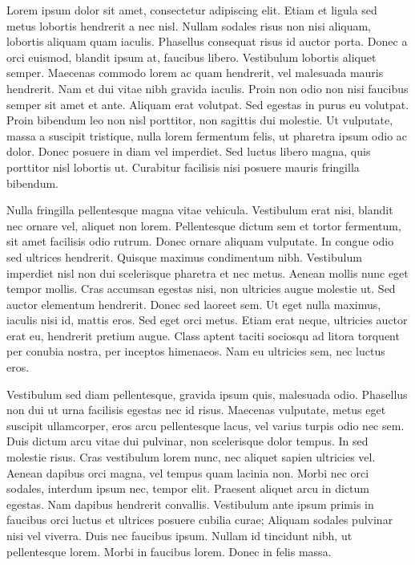 \documentclass[11pt,twoside]{article}
\begin{document}
Lorem ipsum dolor sit amet, consectetur adipiscing elit. Etiam et ligula sed metus lobortis hendrerit a nec nisl. Nullam sodales risus non nisi aliquam, lobortis aliquam quam iaculis. Phasellus consequat risus id auctor porta. Donec a orci euismod, blandit ipsum at, faucibus libero. Vestibulum lobortis aliquet semper. Maecenas commodo lorem ac quam hendrerit, vel malesuada mauris hendrerit. Nam et dui vitae nibh gravida iaculis. Proin non odio non nisi faucibus semper sit amet et ante. Aliquam erat volutpat. Sed egestas in purus eu volutpat. Proin bibendum leo non nisl porttitor, non sagittis dui molestie. Ut vulputate, massa a suscipit tristique, nulla lorem fermentum felis, ut pharetra ipsum odio ac dolor. Donec posuere in diam vel imperdiet. Sed luctus libero magna, quis porttitor nisl lobortis ut. Curabitur facilisis nisi posuere mauris fringilla bibendum.

Nulla fringilla pellentesque magna vitae vehicula. Vestibulum erat nisi, blandit nec ornare vel, aliquet non lorem. Pellentesque dictum sem et tortor fermentum, sit amet facilisis odio rutrum. Donec ornare aliquam vulputate. In congue odio sed ultrices hendrerit. Quisque maximus condimentum nibh. Vestibulum imperdiet nisl non dui scelerisque pharetra et nec metus. Aenean mollis nunc eget tempor mollis. Cras accumsan egestas nisi, non ultricies augue molestie ut. Sed auctor elementum hendrerit. Donec sed laoreet sem. Ut eget nulla maximus, iaculis nisi id, mattis eros. Sed eget orci metus. Etiam erat neque, ultricies auctor erat eu, hendrerit pretium augue. Class aptent taciti sociosqu ad litora torquent per conubia nostra, per inceptos himenaeos. Nam eu ultricies sem, nec luctus eros.

Vestibulum sed diam pellentesque, gravida ipsum quis, malesuada odio. Phasellus non dui ut urna facilisis egestas nec id risus. Maecenas vulputate, metus eget suscipit ullamcorper, eros arcu pellentesque lacus, vel varius turpis odio nec sem. Duis dictum arcu vitae dui pulvinar, non scelerisque dolor tempus. In sed molestie risus. Cras vestibulum lorem nunc, nec aliquet sapien ultricies vel. Aenean dapibus orci magna, vel tempus quam lacinia non. Morbi nec orci sodales, interdum ipsum nec, tempor elit. Praesent aliquet arcu in dictum egestas. Nam dapibus hendrerit convallis. Vestibulum ante ipsum primis in faucibus orci luctus et ultrices posuere cubilia curae; Aliquam sodales pulvinar nisi vel viverra. Duis nec faucibus ipsum. Nullam id tincidunt nibh, ut pellentesque lorem. Morbi in faucibus lorem. Donec in felis massa.
\end{document}
